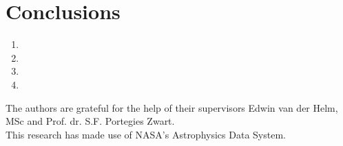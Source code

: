 \documentclass{aa}
\begin{document}
\section{Conclusions}\label{sec:conclusions}
\begin{enumerate}
    \item
    \item
    \item
    \item
\end{enumerate}


\begin{acknowledgements}
The authors are grateful for the help of their supervisors Edwin van der Helm, MSc and Prof. dr. S.F. Portegies Zwart. \\

This research has made use of NASA's Astrophysics Data System.
\end{acknowledgements}





\end{document}

